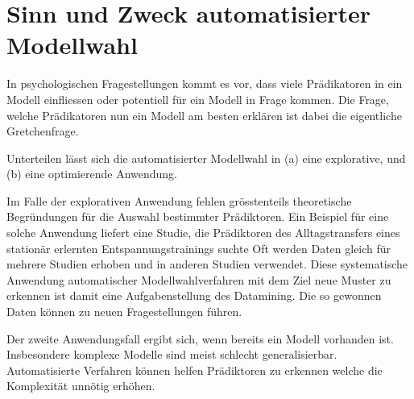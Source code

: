 \section{Sinn und Zweck automatisierter Modellwahl}
In psychologischen Fragestellungen kommt es vor, dass viele Prädikatoren in ein Modell einfliessen oder potentiell für ein Modell in Frage kommen.
Die Frage, welche Prädikatoren nun ein Modell am besten erklären ist dabei die eigentliche Gretchenfrage. 

Unterteilen lässt sich die automatisierter Modellwahl in (a) eine explorative, und (b) eine optimierende Anwendung. 

Im Falle der explorativen Anwendung fehlen grösstenteils theoretische Begründungen für die Auswahl bestimmter Prädiktoren. Ein Beispiel für eine solche Anwendung liefert eine Studie, die Prädiktoren des Alltagstransfers eines stationär erlernten Entspannungstrainings suchte \cite{023755520080101}
Oft werden Daten gleich für mehrere Studien erhoben und in anderen Studien verwendet.
Diese systematische Anwendung automatischer Modellwahlverfahren mit dem Ziel neue Muster zu erkennen ist damit eine Aufgabenstellung des Datamining. 
Die so gewonnen Daten können zu neuen Fragestellungen führen. 

Der zweite Anwendungsfall ergibt sich, wenn bereits ein Modell vorhanden ist. Insbesondere komplexe Modelle sind meist schlecht generalisierbar. Automatisierte Verfahren können  helfen Prädiktoren zu erkennen welche die Komplexität unnötig erhöhen.